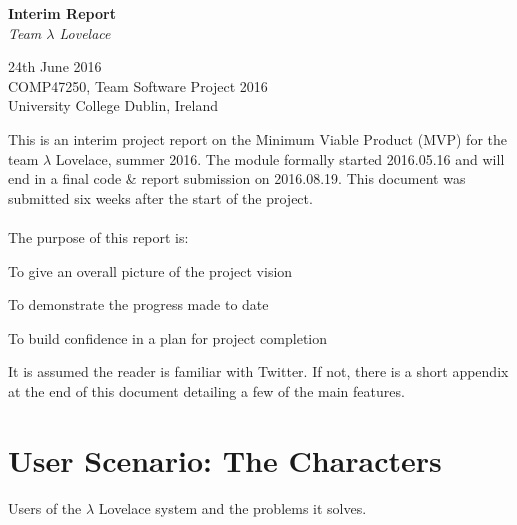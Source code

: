 \documentclass{article}
\begin{document}
\begin{center}
	{\LARGE \textbf{Interim Report}} \\
	\vspace{0.5em}
	\textsl{Team $\lambda$ Lovelace}
\end{center}

\vspace{0.5em}

\begin{center}
	24th June 2016 \\
	COMP47250, Team Software Project 2016 \\ 
	University College Dublin, Ireland \\
\end{center}

\vspace{0.5em}



\noindent This is an interim project report on the Minimum Viable Product (MVP) for the team $\lambda$ Lovelace, summer 2016. The module formally started 2016.05.16 and will end in a final code \& report submission on 2016.08.19. This document was submitted six weeks after the start of the project.
\\\\
The purpose of this report is:

\begin{itemize*}
    \item To give an overall picture of the project vision
    \item To demonstrate the progress made to date
    \item To build confidence in a plan for project completion
\end{itemize*}

\noindent It is assumed the reader is familiar with Twitter. If not, there is a short appendix at the end of this document detailing a few of the main features.


\section{User Scenario: The Characters}
%
%
%
Users of the $\lambda$ Lovelace system and the problems it solves.
\end{document}
